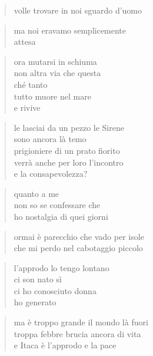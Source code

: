 	\begin{verse}
		volle trovare in noi sguardo d’uomo
	\end{verse}

	\begin{verse}
		ma noi eravamo semplicemente\\
		attesa
	\end{verse}

	\begin{verse}
		ora mutarsi in schiuma\\
		non altra via che questa\\
		ché tanto\\
		tutto muore nel mare\\
		e rivive
	\end{verse}


\clearpage



	\begin{verse}
		le lasciai da un pezzo le Sirene\\
		sono ancora là temo\\
		prigioniere di un prato fiorito\\
		verrà anche per loro l’incontro\\
		e la consapevolezza?
	\end{verse}

	\begin{verse}
		quanto a me\\
		non so se confessare che\\
		ho nostalgia di quei giorni
	\end{verse}

	\begin{verse}
		ormai è parecchio che vado per isole\\
		che mi perdo nel cabotaggio piccolo
	\end{verse}

	\begin{verse}
		l’approdo lo tengo lontano\\
		ci son nato sì\\
		ci ho conosciuto donna\\
		ho generato
	\end{verse}

	\begin{verse}
		ma è troppo grande il mondo là fuori\\
		troppa febbre brucia ancora di vita\\
		e Itaca è l’approdo e la pace
	\end{verse}

